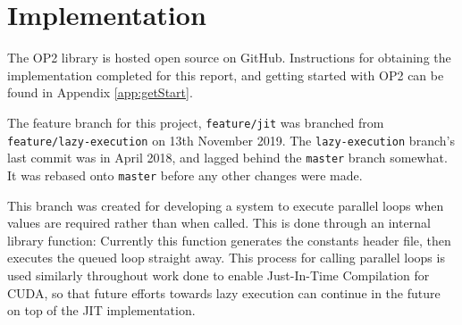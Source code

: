 
\section{Implementation}
The OP2 library is hosted open source on GitHub\cite{OP2rep}. Instructions for obtaining the implementation completed for this report, and getting started with OP2 can be found in Appendix \ref{app:getStart}.
\par
The feature branch for this project, \verb|feature/jit| was branched from \\\verb|feature/lazy-execution| on 13th November 2019. The \verb|lazy-execution| branch's last commit was in April 2018, and lagged behind the \verb|master| branch somewhat. It was rebased onto \verb|master| before any other changes were made.
\par
This branch was created for developing a system to execute parallel loops when values are required rather than when called. This is done through an internal library function:
Currently this function generates the constants header file, then executes the queued loop straight away. This process for calling parallel loops is used similarly throughout work done to enable Just-In-Time Compilation for CUDA, so that future efforts towards lazy execution can continue in the future on top of the JIT implementation.

